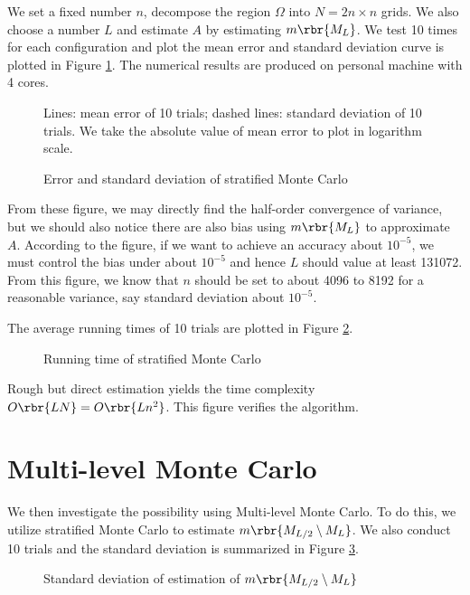 \documentclass[english, nochinese]{pnote}
\begin{document}
We set a fixed number $n$, decompose the region $\Omega$ into $ N = 2 n \times n $ grids. We also choose a number $L$ and estimate $A$ by estimating $ m \rbr{M_L} $. We test 10 times for each configuration and plot the mean error and standard deviation curve is plotted in Figure \ref{Fig:Err}. The numerical results are produced on personal machine with 4 cores.

\begin{figure}[htbp]
{
\centering

\caption{Error and standard deviation of stratified Monte Carlo}
\label{Fig:Err}
}
{
\footnotesize Lines: mean error of 10 trials; dashed lines: standard deviation of 10 trials. We take the absolute value of mean error to plot in logarithm scale.
}
\end{figure}

From these figure, we may directly find the half-order convergence of variance, but we should also notice there are also bias using $ m \rbr{M_L} $ to approximate $A$. According to the figure, if we want to achieve an accuracy about $10^{-5}$, we must control the bias under about $10^{-5}$ and hence $L$ should value at least 131072. From this figure, we know that $n$ should be set to about 4096 to 8192 for a reasonable variance, say standard deviation about $10^{-5}$.

The average running times of 10 trials are plotted in Figure \ref{Fig:Time}.

\begin{figure}[htbp]
\centering

\caption{Running time of stratified Monte Carlo}
\label{Fig:Time}
\end{figure}

Rough but direct estimation yields the time complexity $ O \rbr{ L N } = O \rbr{ L n^2 } $. This figure verifies the algorithm.

\section{Multi-level Monte Carlo}

We then investigate the possibility using Multi-level Monte Carlo. To do this, we utilize stratified Monte Carlo to estimate $ m \rbr{ M_{ L / 2 } \setminus M_L } $. We also conduct 10 trials and the standard deviation is summarized in Figure \ref{Fig:Multi}.

\begin{figure}[htbp]
\centering

\caption{Standard deviation of estimation of $ m \rbr{ M_{ L / 2 } \setminus M_L } $}
\label{Fig:Multi}
\end{figure}
\end{document}
